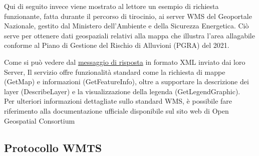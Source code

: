 
Qui di seguito invece viene mostrato al lettore un esempio di richiesta funzionante, fatta durante il percorso di tirocinio, ai server WMS del Geoportale Nazionale, gestito dal Ministero dell'Ambiente e della Sicurezza Energetica.
Ciò serve per ottenere dati geospaziali relativi alla mappa che illustra l'area allagabile conforme al Piano di Gestione del Rischio di Alluvioni (PGRA) del 2021.

Come si può vedere dal \href{http://wms.pcn.minambiente.it/ogc?map=/ms_ogc/WMS_v1.3/Vettoriali/Alluvioni_Estensione.map&service=wms&request=getCapabilities}{messaggio di risposta} in formato XML inviato dai loro Server,
Il servizio offre funzionalità standard come la richiesta di mappe (GetMap) e informazioni (GetFeatureInfo), oltre a supportare la descrizione dei layer (DescribeLayer) e la visualizzazione della legenda (GetLegendGraphic).
\\Per ulteriori informazioni dettagliate sullo standard WMS, è possibile fare riferimento alla documentazione ufficiale disponibile sul sito web di Open Geospatial Consortium \cite{DocumentazioneWMTS}

\subsection{Protocollo WMTS}

